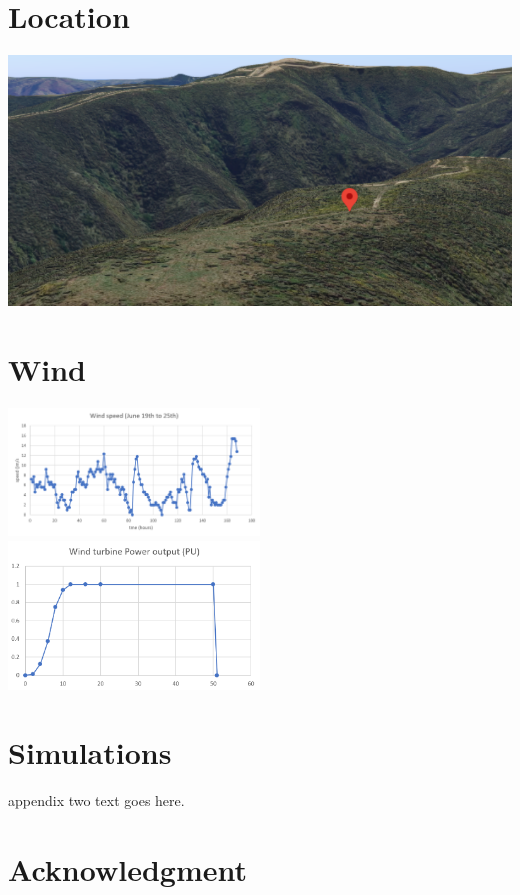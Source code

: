 \documentclass[journal]{IEEEtran}
\begin{document}
    \section{Location}
        \includegraphics[width=\textwidth]{fig/pin_location.png}
        \label{ap:location}
        \section{Wind}
        \includegraphics[width=0.5\textwidth]{fig/windspeed.png}
        \includegraphics[width=0.5\textwidth]{fig/turbineresp.png}
        \label{ap:wind}
        \section{Simulations}
        appendix two text goes here.

\section*{Acknowledgment}

\newpage
\nocite{*}


\end{document}
